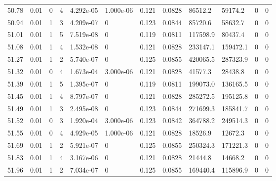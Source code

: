 \documentclass[preview]{standalone}
\begin{document}
{{{{{{{{{{{{{{\begin{tabular}{L{1.2cm}C{1.2cm} C{0.3cm}C{0.5cm} C{1.4cm}C{1.4cm} C{1.4cm}C{1.4cm} C{1.6cm}C{1.6cm} C{1.6cm}C{1.6cm}}
  50.78  &  0.01  & 0     &  4 &  4.292e-05  & 1.000e-06  &  0.121&   0.0828& 86512.2 & 59174.2   &  0 & 0  \\ 
  50.94  &  0.01  & 1     &  3 &  4.209e-07  & 0  &  0.123&   0.0844& 85720.6 & 58632.7   &  0 & 0  \\ 
  51.01  &  0.01  & 1     &  5 &  7.519e-08  & 0  &  0.119&   0.0811& 117598.9 & 80437.4   &  0 & 0  \\ 
  51.08  &  0.01  & 1     &  4 &  1.532e-08  & 0  &  0.121&   0.0828& 233147.1 & 159472.1   &  0 & 0  \\ 
  51.27  &  0.01  & 1     &  2 &  5.740e-07  & 0  &  0.125&   0.0855& 420065.5 & 287323.9   &  0 & 0  \\ 
  51.32  &  0.01  & 0     &  4 &  1.673e-04  & 3.000e-06  &  0.121&   0.0828& 41577.3 & 28438.8   &  0 & 0  \\ 
  51.39  &  0.01  & 1     &  5 &  1.395e-07  & 0  &  0.119&   0.0811& 199073.0 & 136165.5   &  0 & 0  \\ 
  51.45  &  0.01  & 1     &  4 &  8.797e-07  & 0  &  0.121&   0.0828& 285272.5 & 195125.8   &  0 & 0  \\ 
  51.49  &  0.01  & 1     &  3 &  2.495e-08  & 0  &  0.123&   0.0844& 271699.3 & 185841.7   &  0 & 0  \\ 
  51.52  &  0.01  & 0     &  3 &  1.920e-04  & 3.000e-06  &  0.123&   0.0842& 364788.2 & 249514.3   &  0 & 0  \\ 
  51.55  &  0.01  & 0     &  4 &  4.929e-05  & 1.000e-06  &  0.121&   0.0828& 18526.9 & 12672.3   &  0 & 0  \\ 
  51.69  &  0.01  & 1     &  2 &  5.921e-07  & 0  &  0.125&   0.0855& 250324.3 & 171221.3   &  0 & 0  \\ 
  51.83  &  0.01  & 1     &  4 &  3.167e-06  & 0  &  0.121&   0.0828& 21444.8 & 14668.2   &  0 & 0  \\ 
  51.96  &  0.01  & 1     &  2 &  7.034e-07  & 0  &  0.125&   0.0855& 169440.4 & 115896.9   &  0 & 0  \\ 
\hline 
\end{tabular} 

}}}}}}}}}}}}}}
\end{document}
